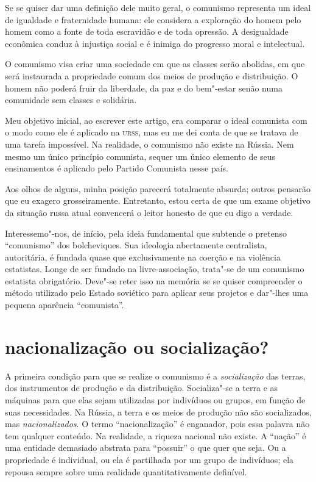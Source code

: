 Se se quiser dar uma definição dele muito geral, o comunismo representa
um ideal de igualdade e fraternidade humana: ele considera a
exploração do homem pelo homem como a fonte de toda escravidão e de
toda opressão. A desigualdade econômica conduz à injustiça social e é
inimiga do progresso moral e intelectual.

O comunismo visa criar uma sociedade em que as classes serão abolidas,
em que será instaurada a propriedade comum dos meios de produção e
distribuição. O homem não poderá fruir da liberdade, da paz e do
bem"-estar senão numa comunidade sem classes e solidária.

Meu objetivo inicial, ao escrever este artigo, era comparar o ideal
comunista com o modo como ele é aplicado na \textsc{urss}, mas eu me dei
conta de que se tratava de uma tarefa impossível. Na realidade, o
comunismo não existe na Rússia. Nem mesmo um único princípio comunista,
sequer um único elemento de seus ensinamentos é aplicado pelo
Partido Comunista nesse país.

Aos olhos de alguns, minha posição parecerá totalmente absurda; outros
pensarão que eu exagero grosseiramente. Entretanto, estou certa de que
um exame objetivo da situação russa atual convencerá o leitor honesto
de que eu digo a verdade.

Interessemo"-nos, de início, pela ideia fundamental que subtende o
pretenso “comunismo” dos bolcheviques. Sua ideologia abertamente
centralista, autoritária, é fundada quase que exclusivamente na coerção e
na violência estatistas. Longe de ser fundado na livre-associação,
trata"-se de um comunismo estatista obrigatório. Deve"-se reter
isso na memória se se quiser compreender o método utilizado pelo Estado
soviético para aplicar seus projetos e dar"-lhes uma pequena aparência
“comunista”.

\section*{nacionalização ou socialização?}
A primeira condição para que se realize o comunismo é a \textit{socialização} das 
terras, dos instrumentos de produção e da distribuição. Socializa"-se
a terra e as máquinas para que elas sejam utilizadas por indivíduos ou
grupos, em função de suas necessidades. Na Rússia, a terra e os meios
de produção não são socializados, mas \textit{nacionalizados}. O termo 
“nacionalização” é enganador, pois essa palavra não tem qualquer
conteúdo. Na realidade, a riqueza nacional não existe. A “nação” é uma
entidade demasiado abstrata para “possuir” o que quer que seja. Ou a
propriedade é individual, ou ela é partilhada por um grupo de
indivíduos; ela repousa sempre sobre uma realidade quantitativamente
definível. 

